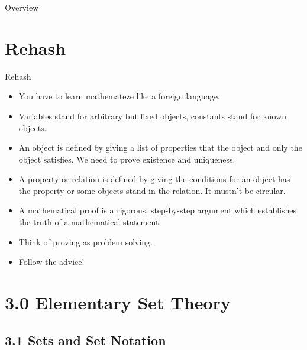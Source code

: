 \setcounter{framenumber}{63}
\begin{frame}
	\maketitle
\end{frame}

\begin{frame}{Overview}
\tableofcontents
\end{frame}

\section{Rehash}
\begin{frame}{Rehash}

\begin{itemize}

	\item You have to learn mathemateze like a foreign language.
	
	\item Variables stand for arbitrary but fixed objects, constants stand for known objects. 

	\item \alert{An object is defined by giving a list of properties that the object and only the object satisfies. We need to prove existence and uniqueness.}	
				
		\item \alert{A property or relation is defined by giving the conditions for an object has the property or some objects stand in the relation. It mustn't be circular.}
		
		\item  \alert{A mathematical proof is a rigorous, step-by-step argument which establishes the truth of a mathematical statement.} 

		\item Think of proving as problem solving. 
		
		\item Follow the advice!


\end{itemize}

\end{frame}

\section{3.0 Elementary Set Theory}
\subsection{3.1 Sets and Set Notation}

